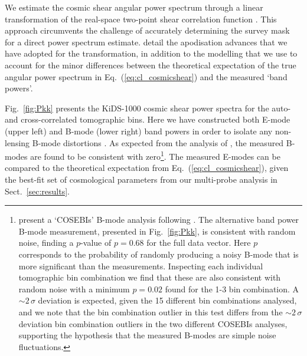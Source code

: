We estimate the cosmic shear angular power spectrum through a linear transformation of the real-space two-point shear correlation function \citep{schneider/etal:2002}.  This approach circumvents the challenge of accurately determining the survey mask for a direct power spectrum estimate.  \citet{joachimi/etal:inprep} detail the apodisation advances that we have adopted for the transformation, in addition to the modelling that we use to account for the minor differences between the theoretical expectation of the true angular power spectrum in Eq.~(\ref{eq:cl_cosmicshear}) and the measured `band powers'.    
 
Fig.~\ref{fig:Pkk} presents the \citet{asgari/etal:inprep} KiDS-1000 cosmic shear power spectra for the auto- and cross-correlated tomographic bins.   Here we have constructed both E-mode (upper left) and B-mode (lower right) band powers in order to isolate any non-lensing B-mode distortions \citep[see equations 17 to 21 of][]{joachimi/etal:inprep}.     As expected from the analysis of \citet{giblin/etal:inprep}, the measured B-modes are found to be consistent with zero\footnote{\citet{giblin/etal:inprep} present a `COSEBIs' B-mode analysis following \citet{asgari/etal:2019}.  The alternative band power B-mode measurement, presented in Fig.~\ref{fig:Pkk}, is consistent with random noise, finding a $p$-value of $p=0.68$ for the full data vector.  Here $p$ corresponds to the probability of randomly producing a noisy B-mode that is more significant than the measurements.  Inspecting each individual tomographic bin combination we find that these are also consistent with random noise with a minimum $p=0.02$ found for the 1-3 bin combination.   A $\sim\!2\,\sigma$ deviation is expected, given the 15 different bin combinations analysed, and we note that the bin combination outlier in this test differs from the $\sim\!2\,\sigma$ deviation bin combination outliers in the two different COSEBIs analyses, supporting the hypothesis that the measured B-modes are simple noise fluctuations.}.   The measured E-modes can be compared to the theoretical expectation from Eq.~(\ref{eq:cl_cosmicshear}), given the best-fit set of cosmological parameters from our multi-probe analysis in Sect.~\ref{sec:results}.


